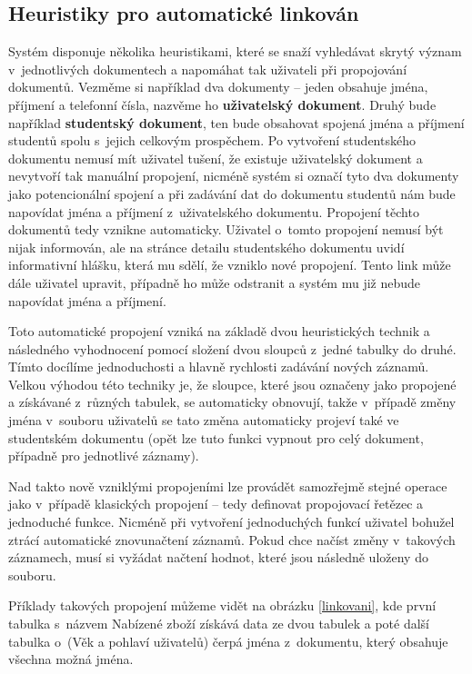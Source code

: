 \subsection{Heuristiky pro automatické linkován}
\par Systém disponuje několika heuristikami, které se snaží vyhledávat skrytý význam v~jednotlivých dokumentech a napomáhat tak uživateli při propojování dokumentů. Vezměme si například dva dokumenty -- jeden obsahuje jména, příjmení a telefonní čísla, nazvěme ho \textbf{uživatelský dokument}. Druhý bude například \textbf{studentský dokument}, ten bude obsahovat spojená jména a příjmení studentů spolu s~jejich celkovým prospěchem. Po vytvoření studentského dokumentu nemusí mít uživatel tušení, že existuje uživatelský dokument a nevytvoří tak manuální propojení, nicméně systém si označí tyto dva dokumenty jako potencionální spojení a při zadávání dat do dokumentu studentů nám bude napovídat jména a příjmení z~uživatelského dokumentu. Propojení těchto dokumentů tedy vznikne automaticky. Uživatel o~tomto propojení nemusí být nijak informován, ale na stránce detailu studentského dokumentu uvidí informativní hlášku, která mu sdělí, že vzniklo nové propojení. Tento link může dále uživatel upravit, případně ho může odstranit a systém mu již nebude napovídat jména a příjmení.

\par Toto automatické propojení vzniká na základě dvou heuristických technik a následného vyhodnocení pomocí složení dvou sloupců z~jedné tabulky do druhé. Tímto docílíme jednoduchosti a hlavně rychlosti zadávání nových záznamů. Velkou výhodou této techniky je, že sloupce, které jsou označeny jako propojené a získávané z~různých tabulek, se automaticky obnovují, takže v~případě změny jména v~souboru uživatelů se tato změna automaticky projeví také ve studentském dokumentu (opět lze tuto funkci vypnout pro celý dokument, případně pro jednotlivé záznamy).

\par Nad takto nově vzniklými propojeními lze provádět samozřejmě stejné operace jako v~případě klasických propojení -- tedy definovat propojovací řetězec a jednoduché funkce. Nicméně při vytvoření jednoduchých funkcí uživatel bohužel ztrácí automatické znovunačtení záznamů. Pokud chce načíst změny v~takových záznamech, musí si vyžádat načtení hodnot, které jsou následně uloženy do souboru.

\par Příklady takových propojení můžeme vidět na obrázku \ref{linkovani}, kde první tabulka s~názvem Nabízené zboží získává data ze dvou tabulek a poté další tabulka o~(Věk a pohlaví uživatelů) čerpá jména z~dokumentu, který obsahuje všechna možná jména.

